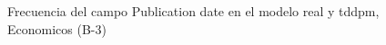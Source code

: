 \begin{figure}[H]
    \centering
    
    \caption{Frecuencia del campo Publication date en el modelo real y tddpm, Economicos (B-3)}
    \label{frecuency-Publication Date-tddpm_mlp}
\end{figure}
